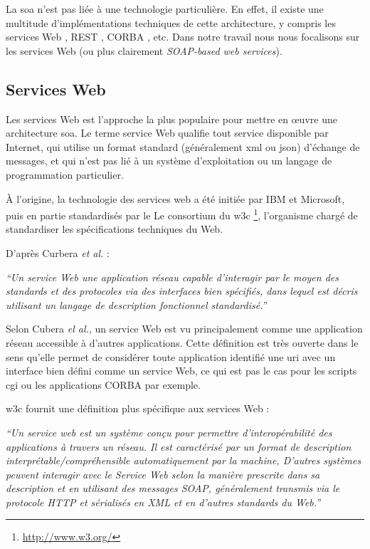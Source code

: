   La \acrshort{soa} n'est pas liée à une technologie particulière. En
  effet, il existe une multitude d'implémentations techniques de cette
  architecture, y compris les services Web \cite{WSA}, REST
  \cite{fielding2000architectural}, CORBA \cite{vinoski1997corba},
  etc. Dans notre travail nous nous focalisons sur les services Web
  (ou plus clairement \textit{SOAP-based web services}).

  \subsection{Services Web}
  \label{sec:ws-def}
  Les services Web est l'approche la plus populaire pour mettre en
  œuvre une architecture \acrshort{soa}. Le terme service Web qualifie
  tout service disponible par Internet, qui utilise un format standard
  (généralement \acrshort{xml} ou \acrshort{json}) d'échange de
  messages, et qui n'est pas lié à un système d'exploitation ou un
  langage de programmation particulier.\\\medskip

  À l'origine, la technologie des services web a été initiée par IBM
  \cite{kreger2001web} et Microsoft, puis en partie standardisés par
  le Le consortium du \acrshort{w3c}
  \footnote{\url{http://www.w3.org/}}, l'organisme chargé de
  standardiser les spécifications techniques du Web.\medskip

  D'après Curbera \emph{et al.} \cite{curbera2001web}:\bigskip

  \textit{``Un service Web une application réseau capable d'interagir
    par le moyen des standards et des protocoles via des interfaces
    bien spécifiés, dans lequel est décris utilisant un langage de
    description fonctionnel standardisé.''}\bigskip

  Selon Cubera \emph{el al.}, un service Web est vu principalement
  comme une application réseau accessible à d'autres
  applications. Cette définition est très ouverte dans le sens qu'elle
  permet de considérer toute application identifié une \acrshort{uri}
  avec un interface bien défini comme un service Web, ce qui est pas
  le cas pour les scripts \acrshort{cgi} ou les applications CORBA par
  exemple.\medskip

  \acrshort{w3c} fournit une définition plus spécifique aux services
  Web \cite{WSA}:\bigskip

  \textit{``Un service web est un système conçu pour permettre
    d'interopérabilité des applications à travers un réseau.  Il est
    caractérisé par un format de description
    interprétable/compréhensible automatiquement par la machine,
    D'autres systèmes peuvent interagir avec le Service Web selon la
    manière prescrite dans sa description et en utilisant des messages
    SOAP, généralement transmis via le protocole HTTP et sérialisés en
    XML et en d'autres standards du Web.''} \bigskip

